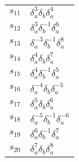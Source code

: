 \documentclass{article}
\begin{document}
\begin{center}
\begin{tabular}{ll}
$s_{11}$ & $\delta_a^{3}\delta_b^{}\delta_a^{4}$ \\
$s_{12}$ & $\delta_a^{3}\delta_b^{-1}\delta_a^{6}$ \\
$s_{13}$ & $\delta_a^{-3}\delta_b^{-1}\delta_a^{8}$ \\
$s_{14}$ & $\delta_a^{4}\delta_b^{}\delta_a^{7}$ \\
$s_{15}$ & $\delta_a^{4}\delta_b^{-1}\delta_a^{5}$ \\
$s_{16}$ & $\delta_a^{-4}\delta_b^{}\delta_a^{-5}$ \\
$s_{17}$ & $\delta_a^{5}\delta_b^{}\delta_a^{6}$ \\
$s_{18}$ & $\delta_a^{-5}\delta_b^{-1}\delta_a^{-6}$ \\
$s_{19}$ & $\delta_a^{6}\delta_b^{-1}\delta_a^{7}$ \\
$s_{20}$ & $\delta_a^{7}\delta_b^{}\delta_a^{8}$ \\
\bottomrule
\end{tabular}
\end{center}

\thispagestyle{empty}
\end{document}
